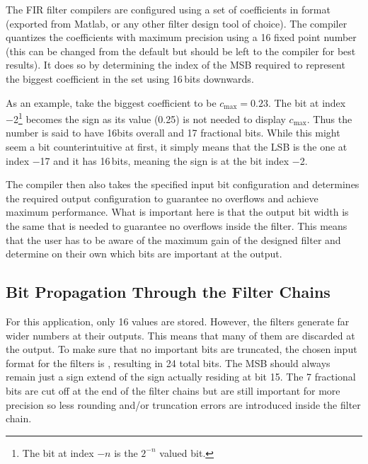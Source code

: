 The  FIR filter  compilers  are  configured using  a  set  of coefficients  in
 format (exported from Matlab, or any other filter design tool of
choice). The compiler quantizes the  coefficients with maximum precision using
a \SI{16}{\bit} fixed  point number (this can be changed  from the default but
should be  left to the compiler  for best results). It does  so by determining
the index of the MSB required to  represent the biggest coefficient in the set
using \num{16}\,bits downwards.

As an example, take the biggest coefficient to be $c_\mathrm{max} = 0.23$. The
bit at  index \num{-2}\footnote{The bit at  index $-n$ is the  $2^{-n}$ valued
bit.} becomes  the sign  as its  value (\num{0.25}) is  not needed  to display
$c_\mathrm{max}$. Thus the  number is  said to have  \num{16}\si{bits} overall
and \num{17} fractional bits. While this  might seem a bit counterintuitive at
first, it simply means  that the LSB is the one at index  \num{-17} and it has
\num{16}\,bits, meaning the sign is at the bit index \num{-2}.

The  compiler  then also  takes  the  specified  input bit  configuration  and
determines the  required output  configuration to  guarantee no  overflows and
achieve maximum  performance.  What is important  here is that the  output bit
width  is  the same  that  is  needed to  guarantee  no  overflows inside  the
filter. This means that  the user has to  be aware of the maximum  gain of the
designed filter  and determine on  their own which  bits are important  at the
output.

%
%
\subsection{Bit Propagation Through the Filter Chains} %
\label{subsec:fpga:bit_propagation}

For  this  application, only  \SI{16}{\bit}  values  are stored. However,  the
filters generate far wider numbers at  their outputs.  This means that many of
them are  discarded at the  output.  To make sure  that no important  bits are
truncated, the chosen  input format for the filters  is , resulting
in \num{24} total bits. The MSB should always remain just a sign extend of the
sign actually  residing at bit  \num{15}. The \num{7} fractional bits  are cut
off at the end of the filter chains but are still important for more precision
so less  rounding and/or  truncation errors are  introduced inside  the filter
chain.

